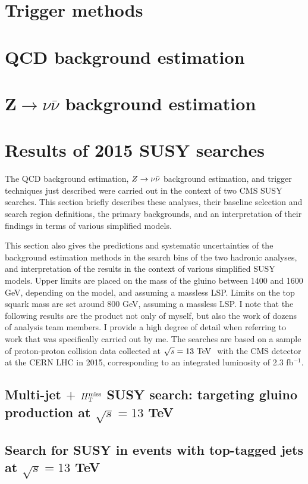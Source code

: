 \section{Trigger methods}
\label{sec:anatrig}

\FloatBarrier

\section{QCD background estimation}
\label{sec:qcd}


\clearpage 
\section{Z$\rightarrow\nu\bar{\nu}$ background estimation}
\label{sec:zinv}


\clearpage 
\section{Results of 2015 SUSY searches}
\label{sec:2015results}
The QCD background estimation, $Z\rightarrow \nu\bar{\nu}$ background estimation, and trigger techniques just described were carried out in the context of two CMS SUSY searches. This section briefly describes these analyses, their baseline selection and search region definitions, the primary backgrounds, and an interpretation of their findings in terms of various simplified models. 

This section also gives the predictions and systematic uncertainties of the background estimation methods in the search bins of the two hadronic analyses, and interpretation of the results in the context of various simplified SUSY models. Upper limits are placed on the mass of the gluino between 1400 and 1600 GeV, depending on the model, and assuming a massless LSP. Limits on the top squark mass are set around 800 GeV, assuming a massless LSP. I note that the following results are the product not only of myself, but also the work of dozens of analysis team members. I provide a high degree of detail when referring to work that was specifically carried out by me. The searches are based on a sample of proton-proton collision data collected at $\sqrt{s}=13~\text{TeV}~$ with the CMS detector at the CERN LHC in 2015, corresponding to an integrated luminosity of 2.3 fb$^{-1}$.

\subsection{Multi-jet $+$ $H_{\text{T}}^{\rm miss}$ SUSY search: targeting gluino production at $\sqrt{s}=13$ TeV}
\label{sec:ra2b2015}


\subsection{Search for SUSY in events with top-tagged jets at $\sqrt{s}=13$ TeV}
\label{sec:hadstop2015}



